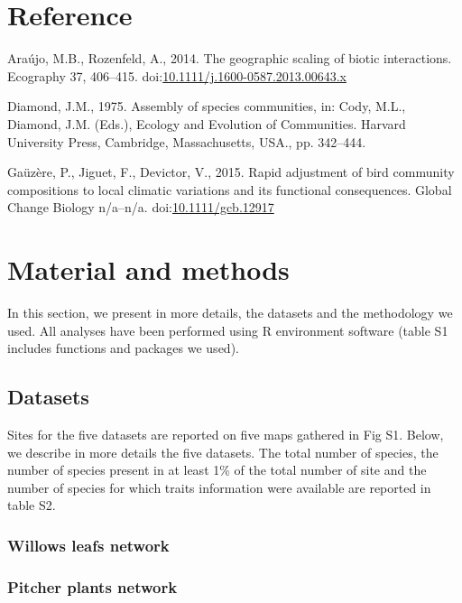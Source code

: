 \newpage

\section*{Reference}\label{reference}

\hypertarget{refs}{}
\hypertarget{ref-Araujo2014}{}
Araújo, M.B., Rozenfeld, A., 2014. The geographic scaling of biotic
interactions. Ecography 37, 406--415.
doi:\href{https://doi.org/10.1111/j.1600-0587.2013.00643.x}{10.1111/j.1600-0587.2013.00643.x}

\hypertarget{ref-Diamond1975}{}
Diamond, J.M., 1975. Assembly of species communities, in: Cody, M.L.,
Diamond, J.M. (Eds.), Ecology and Evolution of Communities. Harvard
University Press, Cambridge, Massachusetts, USA., pp. 342--444.

\hypertarget{ref-Gauzere2015}{}
Gaüzère, P., Jiguet, F., Devictor, V., 2015. Rapid adjustment of bird
community compositions to local climatic variations and its functional
consequences. Global Change Biology n/a--n/a.
doi:\href{https://doi.org/10.1111/gcb.12917}{10.1111/gcb.12917}
\section{Material and methods}\label{material-and-methods}

In this section, we present in more details, the datasets and the
methodology we used. All analyses have been performed using R
environment software (table S1 includes functions and packages we used).

\subsection{Datasets}\label{datasets}

Sites for the five datasets are reported on five maps gathered in Fig
S1. Below, we describe in more details the five datasets. The total
number of species, the number of species present in at least 1\% of the
total number of site and the number of species for which traits
information were available are reported in table S2.

\subsubsection{Willows leafs network}\label{willows-leafs-network}

\subsubsection{Pitcher plants network}\label{pitcher-plants-network}

